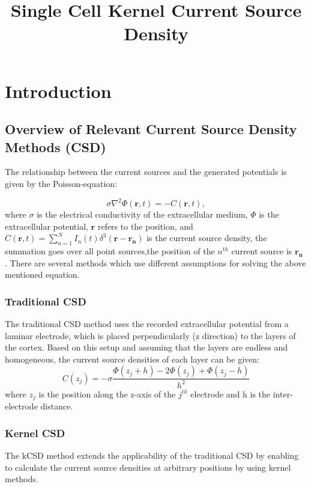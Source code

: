\documentclass[12pt,a4paper]{article}
\title{Single Cell Kernel Current Source Density}
\begin{document}
\maketitle

\section{Introduction}


\subsection{Overview of Relevant Current Source Density Methods (CSD)}
The relationship between the current sources and the generated potentials is given by the Poisson-equation:

\begin{equation}
 \sigma \nabla^2 \Phi(\mathbf{r},t )= -C(\mathbf{r},t),
\label{eq:poisson1}
\end{equation} 
where $\sigma$ is the electrical conductivity of the extracellular medium, $\Phi$ is the 
extracellular potential, $\mathbf{r}$ refers to the position, and 
$C(\mathbf{r},t)= \sum_{n=1}^N I_n (t) \delta^3(\mathbf{r}-\mathbf{r_n}) $
 is the current source density, the summation goes over all point sources,the position of the $n^{th}$ current source is $\mathbf{r_n}$ . There are several methods which use different assumptions for solving the above mentioned equation. 

\subsubsection{Traditional CSD}
The traditional CSD method \cite{Nicholson} uses the recorded extracellular potential from a laminar electrode, which is placed perpendicularly (z direction) to the layers of the cortex. Based on this setup and assuming that the layers are endless and homogeneous, the current source densities of each layer can be given:
\begin{equation}
C(z_j)= - \sigma \frac{\Phi(z_j+h)-2\Phi(z_j)+\Phi(z_j-h)}{h^2}
\end{equation}
 where $z_j$ is the position along the z-axis of the $j^{th}$ electrode and h is the inter-electrode distance.
\subsubsection{Kernel CSD}
The kCSD method \cite{DanielW} extends the applicability of the traditional CSD by enabling to calculate the current source densities at arbitrary positions by using kernel methods. 
\end{document}
